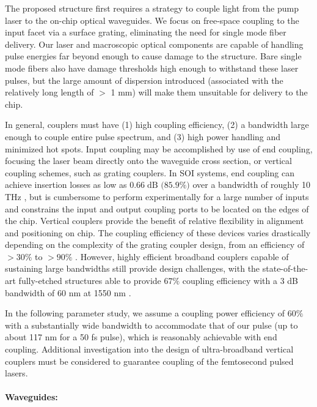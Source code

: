 The proposed structure first requires a strategy to couple light from the pump laser to the on-chip optical waveguides.
We focus on free-space coupling to the input facet via a surface grating, eliminating the need for single mode fiber delivery.
Our laser and macroscopic optical components are capable of handling pulse energies far beyond enough to cause damage to the structure.
Bare single mode fibers also have damage thresholds high enough to withstand these laser pulses, but the large amount of dispersion introduced (associated with the relatively long length of $>$ 1 mm) will make them unsuitable for delivery to the chip.

In general, couplers must have (1) high coupling efficiency, (2) a bandwidth large enough to couple entire pulse spectrum, and (3) high power handling and minimized hot spots.
Input coupling may be accomplished by use of end coupling, focusing the laser beam directly onto the waveguide cross section, or vertical coupling schemes, such as grating couplers.
In SOI systems, end coupling can achieve insertion losses as low as $0.66\;\text{dB (85.9\%)}$ over a bandwidth of roughly 10 THz \cite{pu2010ultra}, but is cumbersome to perform experimentally for a large number of inputs and constrains the input and output coupling ports to be located on the edges of the chip.
Vertical couplers provide the benefit of relative flexibility in alignment and positioning on chip.
The coupling efficiency of these devices varies drastically depending on the complexity of the grating coupler design, from an efficiency of $>30\%$ to $>90\%$ \cite{taillaert2006grating}.
However, highly efficient broadband couplers capable of sustaining large bandwidths still provide design challenges, with the state-of-the-art fully-etched structures able to provide $67\%$ coupling efficiency with a 3 dB bandwidth of 60 nm at 1550 nm \cite{ding2013ultrahigh}.

In the following parameter study, we assume a coupling power efficiency of $60\%$ with a substantially wide bandwidth to accommodate that of our pulse (up to about 117 nm for a 50 fs pulse), which is reasonably achievable with end coupling.
Additional investigation into the design of ultra-broadband vertical couplers must be considered to guarantee coupling of the femtosecond pulsed lasers.

\paragraph{Waveguides:}

